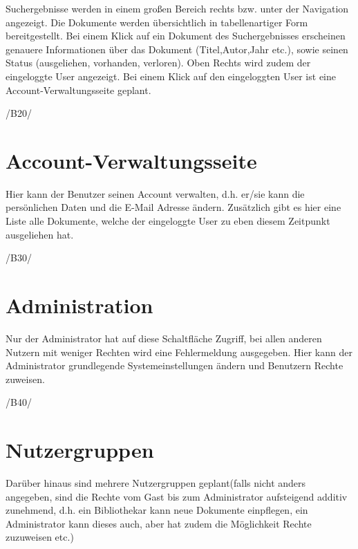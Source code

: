Suchergebnisse werden in einem großen Bereich rechts bzw. unter der Navigation angezeigt. Die Dokumente werden übersichtlich in tabellenartiger Form bereitgestellt. Bei einem Klick auf ein Dokument des Suchergebnisses erscheinen genauere Informationen über das Dokument (Titel,Autor,Jahr etc.), sowie
seinen Status (ausgeliehen, vorhanden, verloren).
Oben Rechts wird zudem der eingeloggte User angezeigt.
Bei einem Klick auf den eingeloggten User ist eine Account-Verwaltungsseite geplant.

/B20/

\section{Account-Verwaltungsseite}
  	 	
Hier kann der Benutzer seinen Account verwalten, d.h. er/sie kann die persönlichen Daten und die E-Mail Adresse ändern.
Zusätzlich gibt es hier eine Liste alle Dokumente, welche der eingeloggte User zu eben diesem Zeitpunkt ausgeliehen hat.

/B30/

\section{Administration}

Nur der Administrator hat auf diese Schaltfläche Zugriff, bei allen anderen Nutzern mit weniger Rechten wird eine Fehlermeldung ausgegeben.
Hier kann der Administrator grundlegende Systemeinstellungen ändern und Benutzern Rechte zuweisen.

/B40/

\section{Nutzergruppen}

Darüber hinaus sind mehrere Nutzergruppen geplant(falls nicht anders angegeben, sind die Rechte vom Gast bis zum Administrator aufsteigend additiv zunehmend, d.h. ein Bibliothekar kann neue Dokumente einpflegen, ein Administrator kann dieses auch, aber hat zudem die Möglichkeit Rechte zuzuweisen etc.) 

